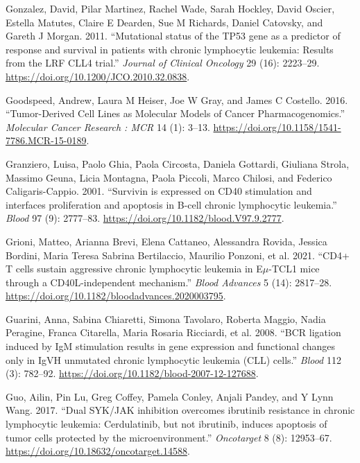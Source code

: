 \documentclass[11pt, a4paper, twosided]{book}
\newenvironment{CSLReferences}%
  {}%
  {\par}
\begin{document}
\begin{CSLReferences}{1}{0}
\leavevmode{}%
Gonzalez, David, Pilar Martinez, Rachel Wade, Sarah Hockley, David Oscier, Estella Matutes, Claire E Dearden, Sue M Richards, Daniel Catovsky, and Gareth J Morgan. 2011. {``{Mutational status of the TP53 gene as a predictor of response and survival in patients with chronic lymphocytic leukemia: Results from the LRF CLL4 trial}.''} \emph{Journal of Clinical Oncology} 29 (16): 2223--29. \url{https://doi.org/10.1200/JCO.2010.32.0838}.

\leavevmode{}%
Goodspeed, Andrew, Laura M Heiser, Joe W Gray, and James C Costello. 2016. {``{Tumor-Derived Cell Lines as Molecular Models of Cancer Pharmacogenomics.}''} \emph{Molecular Cancer Research : MCR} 14 (1): 3--13. \url{https://doi.org/10.1158/1541-7786.MCR-15-0189}.

\leavevmode{}%
Granziero, Luisa, Paolo Ghia, Paola Circosta, Daniela Gottardi, Giuliana Strola, Massimo Geuna, Licia Montagna, Paola Piccoli, Marco Chilosi, and Federico Caligaris-Cappio. 2001. {``{Survivin is expressed on CD40 stimulation and interfaces proliferation and apoptosis in B-cell chronic lymphocytic leukemia}.''} \emph{Blood} 97 (9): 2777--83. \url{https://doi.org/10.1182/blood.V97.9.2777}.

\leavevmode{}%
Grioni, Matteo, Arianna Brevi, Elena Cattaneo, Alessandra Rovida, Jessica Bordini, Maria Teresa Sabrina Bertilaccio, Maurilio Ponzoni, et al. 2021. {``{CD4+ T cells sustain aggressive chronic lymphocytic leukemia in E\(\mu\)-TCL1 mice through a CD40L-independent mechanism}.''} \emph{Blood Advances} 5 (14): 2817--28. \url{https://doi.org/10.1182/bloodadvances.2020003795}.

\leavevmode{}%
Guarini, Anna, Sabina Chiaretti, Simona Tavolaro, Roberta Maggio, Nadia Peragine, Franca Citarella, Maria Rosaria Ricciardi, et al. 2008. {``{BCR ligation induced by IgM stimulation results in gene expression and functional changes only in IgVH unmutated chronic lymphocytic leukemia (CLL) cells}.''} \emph{Blood} 112 (3): 782--92. \url{https://doi.org/10.1182/blood-2007-12-127688}.

\leavevmode{}%
Guo, Ailin, Pin Lu, Greg Coffey, Pamela Conley, Anjali Pandey, and Y Lynn Wang. 2017. {``{Dual SYK/JAK inhibition overcomes ibrutinib resistance in chronic lymphocytic leukemia: Cerdulatinib, but not ibrutinib, induces apoptosis of tumor cells protected by the microenvironment.}''} \emph{Oncotarget} 8 (8): 12953--67. \url{https://doi.org/10.18632/oncotarget.14588}.


\end{CSLReferences}
\end{document}
